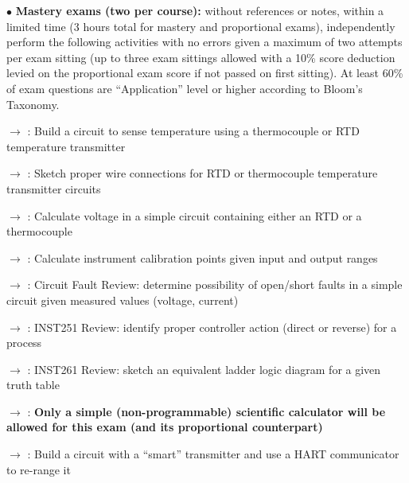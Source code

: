 \item{$\bullet$} {\bf Mastery exams (two per course):} without references or notes, within a limited time (3 hours total for mastery and proportional exams), independently perform the following activities with no errors given a maximum of two attempts per exam sitting (up to three exam sittings allowed with a 10\% score deduction levied on the proportional exam score if not passed on first sitting).  At least 60\% of exam questions are ``Application'' level or higher according to Bloom's Taxonomy.
\item\item{$\rightarrow$} : Build a circuit to sense temperature using a thermocouple or RTD temperature transmitter %
\item\item{$\rightarrow$} : Sketch proper wire connections for RTD or thermocouple temperature transmitter circuits %
\item\item{$\rightarrow$} : Calculate voltage in a simple circuit containing either an RTD or a thermocouple %
\item\item{$\rightarrow$} : Calculate instrument calibration points given input and output ranges %
\item\item{$\rightarrow$} : Circuit Fault Review: determine possibility of open/short faults in a simple circuit given measured values (voltage, current) %
\item\item{$\rightarrow$} : INST251 Review: identify proper controller action (direct or reverse) for a process
\item\item{$\rightarrow$} : INST261 Review: sketch an equivalent ladder logic diagram for a given truth table
\item\item{$\rightarrow$} : {\bf Only a simple (non-programmable) scientific calculator will be allowed for this exam (and its proportional counterpart)}
\vskip 5pt
\item\item{$\rightarrow$} : Build a circuit with a ``smart'' transmitter and use a HART communicator to re-range it %

